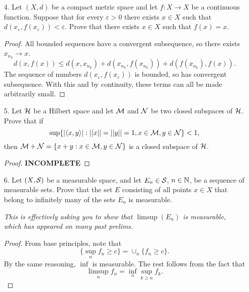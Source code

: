 \begin{itemize}
\begin{proof}
\medskip 

For equality, note that the standard basis of $\{e_n\}$ satisfies $||Te_n||^2 = 2$. Thus $||T||=2$.
\end{proof}






\item[4.] Let $(X, d)$ be a compact metric space and let $f : X \rightarrow X$ be a continuous function. Suppose that for every $\varepsilon > 0$ there exists $x \in X$ such that $d(x_{\varepsilon}, f(x_{\varepsilon})) < \varepsilon$. Prove that there exists $x \in X$ such that $f(x) = x$.
\begin{proof}
All bounded sequences have a convergent subsequence, so there exists $x_{n_k} \rightarrow x$. 
$$d(x,f(x)) \leq d(x,x_{n_k}) + d(x_{n_k},f(x_{n_k})) + d(f(x_{n_k}),f(x)).$$
The sequence of numbers $d(x_{\varepsilon}, f(x_{\varepsilon}))$ is bounded, so has convergent subsequence. With this and by continuity, these terms can all be made arbitrarily small.
\end{proof}







\item[5.] Let $\mathcal{H}$ be a Hilbert space and let $\mathcal{M}$ and $\mathcal{N}$ be two closed subspaces of $\mathcal{H}$. Prove that if
$$\sup \{|\langle{}x,y\rangle| : ||x||=||y|| =1, x \in \mathcal{M}, y \in \mathcal{N}\} < 1,$$
then $\mathcal{M} + \mathcal{N} = \{x + y : x \in \mathcal{M}, y \in \mathcal{N}\}$ is a closed subspace of $\mathcal{H}$.
\begin{proof}
\textbf{INCOMPLETE}
\end{proof}






\item[6.] Let $(X, \mathcal{S})$ be a measurable space, and let $E_n \in \mathcal{S}$, $n \in \mathbb{N}$, be a
sequence of measurable sets. Prove that the set $E$ consisting of all points $x \in X$ that belong
to infinitely many of the sets $E_n$ is measurable.

\textit{This is effectively asking you to show that $\limsup(E_n)$ is measurable, which has appeared on many past prelims.}

\begin{proof}
From base principles, note that $$\{\sup_n f_n \geq c\} = \cup_{n}\{f_n \geq c\}.$$ By the same reasoning, $\inf$ is measurable. The rest follows from the fact that $$\limsup_n f_n = \inf_n \sup_{k \geq n} f_k.$$
\end{proof}






\end{itemize}
